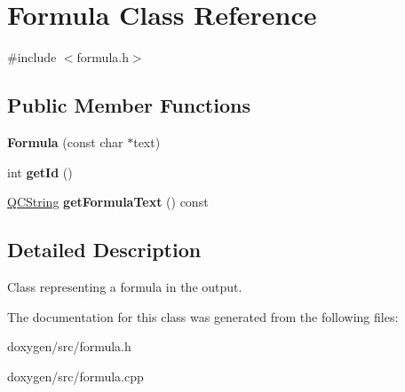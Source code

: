 \hypertarget{class_formula}{}\section{Formula Class Reference}
\label{class_formula}


{\ttfamily \#include $<$formula.\+h$>$}

\subsection*{Public Member Functions}
\begin{DoxyCompactItemize}
\item 
\mbox{\label{class_formula_a9f425f3b9a5f49b7feff7581f2260b91}} 
{\bfseries Formula} (const char $\ast$text)
\item 
\mbox{\label{class_formula_aea87ee65a2669e042bb2733ca70ee716}} 
int {\bfseries get\+Id} ()
\item 
\mbox{\label{class_formula_a54200aad82fe0a65d55528d9a2a464a4}} 
\mbox{\hyperlink{class_q_c_string}{Q\+C\+String}} {\bfseries get\+Formula\+Text} () const
\end{DoxyCompactItemize}


\subsection{Detailed Description}
Class representing a formula in the output. 

The documentation for this class was generated from the following files\+:\begin{DoxyCompactItemize}
\item 
doxygen/src/formula.\+h\item 
doxygen/src/formula.\+cpp\end{DoxyCompactItemize}
